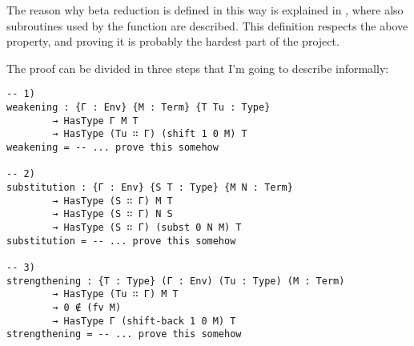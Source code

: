 \documentclass{article}
\begin{document}
\noindent
The reason why beta reduction is defined in this way is explained in \cite[Ch.\ 6]{pierce}, where also subroutines used by the function are described.
This definition respects the above property, and proving it is probably the hardest part of the project.

The proof can be divided in three steps that I'm going to describe informally:

\begin{verbatim}
-- 1)
weakening : {Γ : Env} {M : Term} {T Tu : Type}
        → HasType Γ M T
        → HasType (Tu ∷ Γ) (shift 1 0 M) T
weakening = -- ... prove this somehow

-- 2)
substitution : {Γ : Env} {S T : Type} {M N : Term}
        → HasType (S ∷ Γ) M T
        → HasType (S ∷ Γ) N S
        → HasType (S ∷ Γ) (subst 0 N M) T
substitution = -- ... prove this somehow

-- 3)
strengthening : {T : Type} (Γ : Env) (Tu : Type) (M : Term)
        → HasType (Tu ∷ Γ) M T
        → 0 ∉ (fv M)
        → HasType Γ (shift-back 1 0 M) T
strengthening = -- ... prove this somehow
\end{verbatim}
\end{document}
